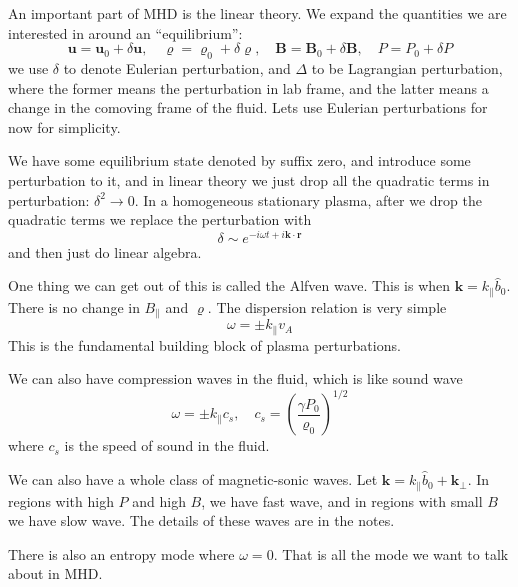 \documentclass[letterpaper, 11pt]{article}
\numberwithin{equation}{section}
\numberwithin{figure}{section}
\begin{document}
An important part of MHD is the linear theory. We expand the quantities we are
interested in around an ``equilibrium'':
\begin{equation}
  \label{eq:12}
  \mathbf{u} = \mathbf{u}_0 + \delta \mathbf{u},\quad \varrho = \varrho_0 + \delta\varrho,\quad
  \mathbf{B} = \mathbf{B}_0 + \delta \mathbf{B},\quad P = P_0 + \delta P
\end{equation}
we use $\delta$ to denote Eulerian perturbation, and $\Delta$ to be Lagrangian
perturbation, where the former means the perturbation in lab frame, and the
latter means a change in the comoving frame of the fluid. Lets use Eulerian
perturbations for now for simplicity.

We have some equilibrium state denoted by suffix zero, and introduce some
perturbation to it, and in linear theory we just drop all the quadratic terms in
perturbation: $\delta^2 \longrightarrow 0$. In a homogeneous stationary plasma,
after we drop the quadratic terms we replace the perturbation with
\begin{equation}
  \label{eq:13}
  \delta \sim e^{-i\omega t + i\mathbf{k}\cdot \mathbf{r}}
\end{equation}
and then just do linear algebra.

One thing we can get out of this is called the Alfven wave. This is when
$\mathbf{k} = k_{\parallel}\hat{b}_0$. There is no change in $B_{\parallel}$ and
$\varrho$. The dispersion relation is very simple
\begin{equation}
  \label{eq:14}
  \omega = \pm k_{\parallel}v_A
\end{equation}
This is the fundamental building block of plasma perturbations.

We can also have compression waves in the fluid, which is like sound wave
\begin{equation}
  \label{eq:15}
  \omega = \pm k_{\parallel}c_s,\quad c_s = \left( \frac{\gamma P_0}{\varrho_{0}} \right)^{1/2}
\end{equation}
where $c_s$ is the speed of sound in the fluid.

We can also have a whole class of magnetic-sonic waves. Let $\mathbf{k} =
k_{\parallel}\hat{b}_0 + \mathbf{k}_{\perp}$. In regions with high $P$ and high
$B$, we have fast wave, and in regions with small $B$ we have slow wave. The
details of these waves are in the notes.

There is also an entropy mode where $\omega = 0$. That is all the mode we want
to talk about in MHD.
\end{document}
